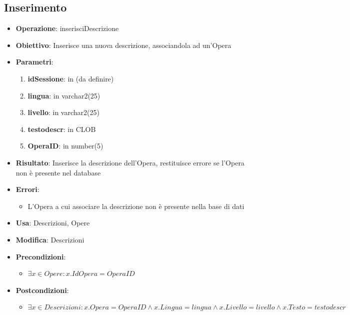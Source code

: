 \documentclass[a4paper,11pt]{article}
\begin{document}
\subsection{Inserimento}
\begin{itemize}
	\item \textbf{Operazione}: inserisciDescrizione
	\item \textbf{Obiettivo}: Inserisce una nuova descrizione, associandola ad un'Opera
	\item \textbf{Parametri}:
	\begin{enumerate}
		\item \textbf{idSessione}: in (da definire)
		\item \textbf{lingua}: in varchar2(25)
		\item \textbf{livello}: in varchar2(25)
		\item \textbf{testodescr}: in CLOB
		\item \textbf{OperaID}: in number(5)
	\end{enumerate}
	\item \textbf{Risultato}: Inserisce la descrizione dell'Opera, restituisce errore se l'Opera non è presente nel database
	\item \textbf{Errori}: 
	\begin{itemize}
		\item L'Opera a cui associare la descrizione non è presente nella base di dati
	\end{itemize}
	\item \textbf{Usa}: Descrizioni, Opere
	\item \textbf{Modifica}: Descrizioni
	\item \textbf{Precondizioni}:
	\begin{itemize}
		\item $\exists x \in Opere : x.IdOpera = OperaID$
	\end{itemize}
	\item \textbf{Postcondizioni}:
	\begin{itemize}
		\item $\exists x \in Descrizioni : x.Opera = OperaID \land x.Lingua = lingua \land x.Livello = livello \land x.Testo = testodescr$
	\end{itemize}
\end{itemize}

\end{document}
